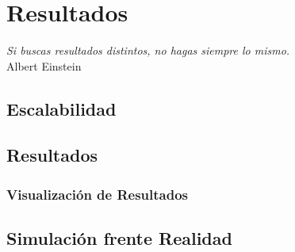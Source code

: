 
\chapter*{Resultados} \label{cap6}


\begin{flushright}
\begin{minipage}{7.85cm}
    {\em Si buscas resultados distintos, no hagas siempre lo mismo.} \\ Albert
    Einstein
\end{minipage}
\end{flushright}

\vspace*{5mm}

\section*{Escalabilidad}
\section*{Resultados}
\subsection*{Visualización de Resultados}
\section*{Simulación frente Realidad}
